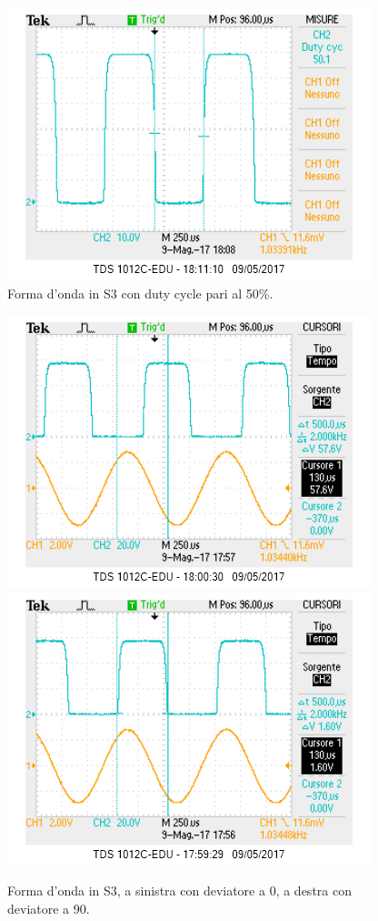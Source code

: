 \documentclass[10pt,a4paper]{article}
\begin{document}
\begin{figure}[!htb]
\centering
  \includegraphics[scale=0.75]{dutycycle50.png}
\caption{Forma d'onda in S3 con duty cycle pari al 50\%. 
\label{osc:duty}}
\end{figure}

\begin{figure}[!htb]
  \includegraphics[scale=0.75]{deviatore0.png}\includegraphics[scale=0.75]{deviatore90.png}
\caption{Forma d'onda in S3, a sinistra con deviatore a 0\degree, a destra con deviatore a 90\degree.\label{osc:dev}}
\end{figure}
\end{document}
